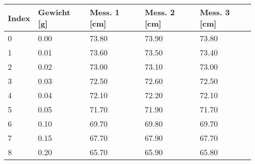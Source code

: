 \documentclass[../main.tex]{subfiles} %
\begin{document}
\begin{center}
    \begin{tabular}{ |l|l|l|l|l| } \hline\rowcolor{Gray!50}
        Index & Gewicht [g] & Mess. 1 [cm] & Mess. 2 [cm] & Mess. 3 [cm] \\\toprule\hline
        0     & 0.00        & 73.80        & 73.90        & 73.80        \\\hline
        1     & 0.01        & 73.60        & 73.50        & 73.40        \\\hline
        2     & 0.02        & 73.00        & 73.10        & 73.00        \\\hline
        3     & 0.03        & 72.50        & 72.60        & 72.50        \\\hline
        4     & 0.04        & 72.10        & 72.20        & 72.10        \\\hline
        5     & 0.05        & 71.70        & 71.90        & 71.70        \\\hline
        6     & 0.10        & 69.70        & 69.80        & 69.70        \\\hline
        7     & 0.15        & 67.70        & 67.90        & 67.70        \\\hline
        8     & 0.20        & 65.70        & 65.90        & 65.80        \\\hline
    \end{tabular}
\end{center}
\end{document}
